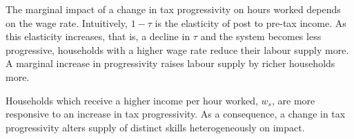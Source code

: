 
The marginal impact of a change in tax progressivity on hours worked depends on the wage rate. 	
Intuitively, $1-\tau$ is the elasticity of post to pre-tax income. As this elasticity increases, that is, a decline in $\tau$ and the system becomes less progressive, households with a higher wage rate reduce their labour supply more. A marginal increase in progressivity raises labour supply by richer households more.  

Households which receive a higher income per hour worked, $w_s$, are more responsive to an increase in tax progressivity. As a consequence, a change in tax progressivity alters supply of distinct skills heterogeneously on impact. 
